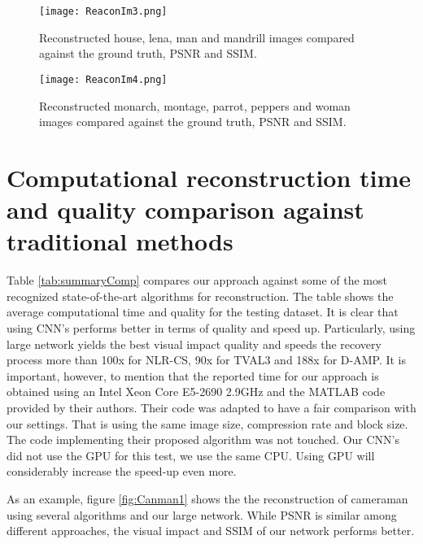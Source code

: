\begin{figure}[!htb]
\vspace{4.5cm}
\centering 
\texttt{[image: ReaconIm3.png]} 
\caption[Reconstructed testing images subset 3]{Reconstructed house, lena, man and mandrill images compared against the ground truth, PSNR and SSIM.}
\label{fig:Recon3} 
\end{figure} 

\begin{figure}[!htb] 
\vspace{3.5cm}
\centering 
\texttt{[image: ReaconIm4.png]}
\caption[Reconstructed testing images subset 4]{Reconstructed monarch, montage, parrot, peppers and woman images compared against the ground truth, PSNR and SSIM.}
\label{fig:Recon4} 
\end{figure} 


\FloatBarrier
\section{Computational reconstruction time and quality comparison against traditional methods}
Table \ref{tab:summaryComp} compares our approach against some of the most recognized state-of-the-art algorithms for reconstruction. The table shows the average computational time and quality for the testing dataset. It is clear that using CNN's performs better in terms of quality and speed up. Particularly, using large network yields the best visual impact quality and speeds the recovery process more than 100x for NLR-CS, 90x for TVAL3 and 188x for D-AMP. It is important, however, to mention that the reported time for our approach is obtained using an Intel Xeon Core E5-2690 2.9GHz and the MATLAB code provided by their authors. Their code was adapted to have a fair comparison with our settings. That is using the same image size, compression rate and block size. The code implementing their proposed algorithm was not touched. Our CNN's did not use the GPU for this test, we use the same CPU. Using GPU will considerably increase the speed-up even more.   

As an example, figure \ref{fig:Canman1} shows the the reconstruction of cameraman using several algorithms and our large network. While PSNR is similar among different approaches, the visual impact and SSIM of our network performs better.

\vspace{1.5cm}

